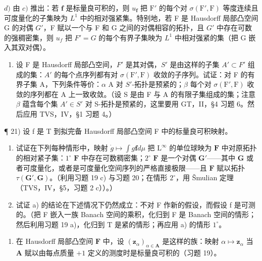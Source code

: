 \(d)\) 由 \(c)\) 推出：若 \(\mathbf{f}\) 是标量良可积的，则 \(u_{\mathbf{f}}\) 把 \(\mathrm{F}'\) 的每个对 \(\sigma (\mathrm{F}',\mathrm{F})\) 等度连续且可度量化的子集映为 \(L^{1}\) 中的相对强紧集。特别地，若 F 是 Hausdorff 局部凸空间 G 的对偶 \(G'\)，F 赋以一个与 F 和 G 之间的对偶相容的拓扑，且 \(G'\) 中存在可数的强稠密集，则 \(u_{f}\) 把 \(F' = G\) 的每个有界子集映为 \(L^{1}\) 中相对强紧的集（把 G 嵌入其双对偶）。

\begin{enumerate}
\def\labelenumi{\arabic{enumi})}
\setcounter{enumi}{19}
\tightlist
\item
  设 F 是 Hausdorff 局部凸空间，\(F'\) 是其对偶，\(S'\) 是由这样的子集 \(A' \subset F'\) 组成的集：\(A'\) 的每个点序列都有对 \(\sigma(\mathrm{F}',\mathrm{F})\) 收敛的子序列。试证：对 F 的有界子集 A，下列条件等价：\(\alpha\) A 对 \(S'\)-拓扑是预紧的；\(\beta\) 每个对 \(\sigma(\mathrm{F}',\mathrm{F})\) 收敛的序列都在 A 上一致收敛。（设 S 是由 F 与 A 的有限子集组成的集；注意 \(\beta\) 蕴含每个集 \(A' \in S'\) 对 S-拓扑是预紧的，这里要用 GT，II，§4 习题 6。然后应用 TVS，IV，§1 习题 4。）
\end{enumerate}

¶ 21) 设 f 是 T 到拟完备 Hausdorff 局部凸空间 F 中的标量良可积映射。

\begin{enumerate}
\def\labelenumi{\alph{enumi})}
\item
  试证在下列每种情形中，映射 \(\dot{g} \mapsto \int g\mathbf{f}  d\mu\) 把 \(\mathrm{L}^{\infty}\) 的单位球映为 \(\mathbf{F}\) 中对原拓扑的相对紧子集：\(1^{\circ}\) \(\mathbf{F}\) 中存在可数稠密集；\(2^{\circ}\) \(\mathbf{F}\) 是一个对偶 \(\mathbf{G}'\)——其中 \(\mathbf{G}\) 或者可度量化，或者是可度量化空间序列的严格直接极限——且 \(\mathbf{F}\) 赋以拓扑 \(\tau (\mathbf{G}',\mathbf{G})\)。（利用习题 19 c) 与习题 20；在情形 \(2^{\circ}\)，用 Šmulian 定理（TVS，IV，§5，习题 2 c））。）
\item
  试证 a) 的结论在下述情况下仍然成立：不对 F 作新的假设，而假设 f 是可测的。（把 F 嵌入一族 Banach 空间的乘积，化归到 F 是 Banach 空间的情形；然后利用习题 19 a)，化归到 T 是紧的情形；再应用 a) 的情形 \(1^{\circ}\)。
\end{enumerate}

\begin{enumerate}
\def\labelenumi{\arabic{enumi})}
\setcounter{enumi}{21}
\tightlist
\item
  在 Hausdorff 局部凸空间 \(\mathbf{F}\) 中，设 \((\mathbf{z}_{\alpha})_{\alpha \in \mathbf{A}}\) 是这样的族：映射 \(\alpha \mapsto \mathbf{z}_{\alpha}\) 当 \(\mathbf{A}\) 赋以由每点质量 \(+1\) 定义的测度时是标量良可积的（习题 19）。
\end{enumerate}

